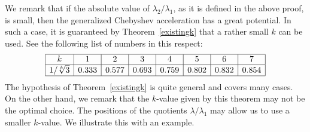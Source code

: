 \documentclass[reqno]{amsart}
\numberwithin{equation}{section}
\theoremstyle{plain}
\theoremstyle{definition}
\begin{document}
We remark that if the absolute value of $\lambda_2/\lambda_1$, as it is defined in the above proof, is small, then the generalized Chebyshev acceleration has a great potential. In such a case, it is guaranteed by Theorem~\ref{existingk} that a rather small $k$ can be used. See the following list of numbers in this respect:
\begin{equation}\label{k-ratios}
	\begin{array}{|c|c|c|c|c|c|c|c|}\hline
		k&1&2&3&4&5&6&7 \\ \hline
		1/\sqrt[k]{3}&0.333&0.577&0.693&0.759&0.802&0.832&0.854\\ \hline
	\end{array}
\end{equation}
The hypothesis of Theorem~\ref{existingk} is quite general and covers many cases. On the other hand, we remark that the $k$-value given by this theorem may not be the optimal choice. The positions of the quotients $\lambda/\lambda_1$ may allow us to use a smaller $k$-value. We illustrate this with an example. 
\end{document}
